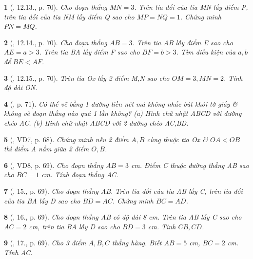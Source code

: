 \documentclass{article}
\newtheorem{baitoan}{}
\begin{document}
\begin{baitoan}[\cite{Binh_boi_duong_Toan_6_tap_2}, 12.13., p. 70]
	Cho đoạn thẳng $MN = 3$. Trên tia đối của tia MN lấy điểm P, trên tia đối của tia NM lấy điểm Q sao cho $MP = NQ = 1$. Chứng minh $PN = MQ$.
\end{baitoan}

\begin{baitoan}[\cite{Binh_boi_duong_Toan_6_tap_2}, 12.14., p. 70]
	Cho đoạn thẳng $AB = 3$. Trên tia AB lấy điểm E sao cho $AE = a > 3$. Trên tia BA lấy điểm F sao cho $BF = b > 3$. Tìm điều kiện của $a,b$ để $BE < AF$.
\end{baitoan}

\begin{baitoan}[\cite{Binh_boi_duong_Toan_6_tap_2}, 12.15., p. 70]
	Trên tia Ox lấy 2 điểm M,N sao cho $OM = 3,MN = 2$. Tính độ dài ON.
\end{baitoan}

\begin{baitoan}[\cite{Binh_boi_duong_Toan_6_tap_2}, p. 71]
	Có thể vẽ bằng 1 đường liền nét mà không nhấc bút khỏi tờ giấy \& không vẽ đoạn thẳng nào quá 1 lần không? (a) Hình chữ nhật ABCD với đường chéo AC. (b) Hình chữ nhật ABCD với 2 đường chéo AC,BD.
\end{baitoan}

\begin{baitoan}[\cite{Binh_Toan_6_tap_2}, VD7, p. 68]
	Chứng minh nếu 2 điểm $A,B$ cùng thuộc tia Ox \& $OA < OB$ thì điểm A nằm giữa 2 điểm $O,B$.
\end{baitoan}

\begin{baitoan}[\cite{Binh_Toan_6_tap_2}, VD8, p. 69]
	Cho đoạn thẳng $AB = 3$ {\rm cm}. Điểm C thuộc đường thẳng AB sao cho $BC = 1$ {\rm cm}. Tính  đoạn thẳng AC.
\end{baitoan}

\begin{baitoan}[\cite{Binh_Toan_6_tap_2}, 15., p. 69]
	Cho đoạn thẳng AB. Trên tia đối của tia AB lấy C, trên tia đối của tia BA lấy D sao cho $BD = AC$. Chứng minh $BC = AD$.
\end{baitoan}

\begin{baitoan}[\cite{Binh_Toan_6_tap_2}, 16., p. 69]
	Cho đoạn thẳng AB có độ dài {\rm8 cm}. Trên tia AB lấy C sao cho $AC = 2$ {\rm cm}, trên tia BA lấy D sao cho $BD = 3$ {\rm cm}. Tính  $CB,CD$.
\end{baitoan}

\begin{baitoan}[\cite{Binh_Toan_6_tap_2}, 17., p. 69]
	Cho 3 điểm $A,B,C$ thẳng hàng. Biết $AB = 5$ {\rm cm}, $BC = 2$ {\rm cm}. Tính  AC.
\end{baitoan}
\end{document}
